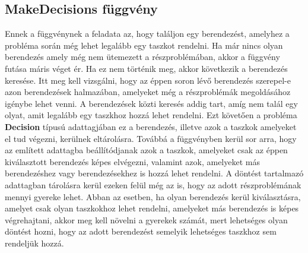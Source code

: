 \subsection{MakeDecisions függvény}
Ennek a függvénynek a feladata az, hogy találjon egy berendezést, amelyhez a probléma során még lehet legalább egy taszkot rendelni. Ha már nincs olyan berendezés amely még nem ütemezett a részproblémában, akkor a függvény futása máris véget ér. Ha ez nem történik meg, akkor következik a berendezés keresése. Itt meg kell vizsgálni, hogy az éppen soron lévő berendezés szerepel-e azon berendezések halmazában, amelyeket még a részproblémák megoldásához igénybe lehet venni. A berendezések közti keresés addig tart, amíg nem talál egy olyat, amit legalább egy taszkhoz hozzá lehet rendelni. Ezt követően a probléma \textbf{Decision} típusú adattagjában ez a berendezés, illetve azok a taszkok amelyeket el tud végezni, kerülnek eltárolásra. Továbbá a függvényben kerül sor arra, hogy az említett adattagba beállítódjanak azok a taszkok, amelyeket csak az éppen kiválasztott berendezés képes elvégezni, valamint azok, amelyeket más berendezéshez vagy berendezésekhez is hozzá lehet rendelni. A döntést tartalmazó adattagban tárolásra kerül ezeken felül még az is, hogy az adott részproblémának mennyi gyereke lehet. Abban az esetben, ha olyan berendezés kerül kiválasztásra, amelyet csak olyan taszkokhoz lehet rendelni, amelyeket más berendezés is képes végrehajtani, akkor meg kell növelni a gyerekek számát, mert lehetséges olyan döntést hozni, hogy az adott berendezést semelyik lehetséges taszkhoz sem rendeljük hozzá.   
